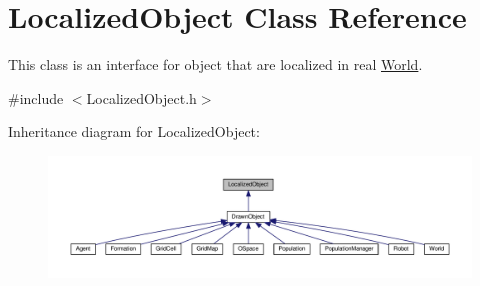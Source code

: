 \hypertarget{classLocalizedObject}{}\section{Localized\+Object Class Reference}
\label{classLocalizedObject}


This class is an interface for object that are localized in real \hyperlink{classWorld}{World}.  




{\ttfamily \#include $<$Localized\+Object.\+h$>$}



Inheritance diagram for Localized\+Object\+:\nopagebreak
\begin{figure}[H]
\begin{center}
\leavevmode
\includegraphics[width=350pt]{classLocalizedObject__inherit__graph}
\end{center}
\end{figure}
